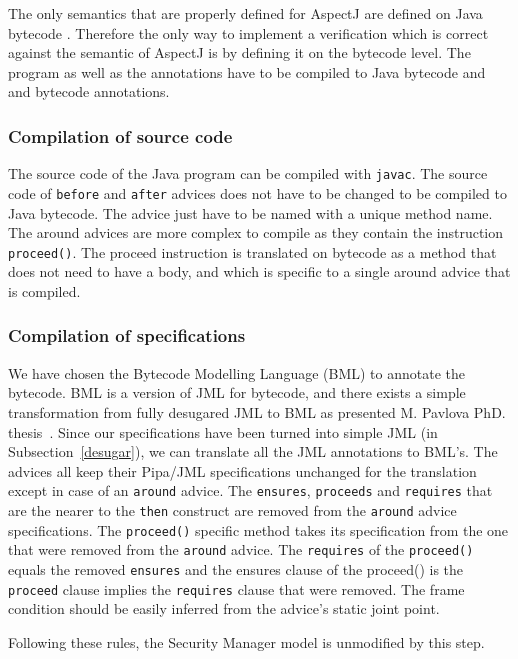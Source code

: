 The only semantics that are properly defined for AspectJ are defined
on Java bytecode \cite{weaving06,weaving04}. Therefore the only way to
implement a verification which is correct against the semantic of
AspectJ is by defining it on the bytecode level.  The program as well
as the annotations have to be compiled to Java bytecode and
and bytecode annotations. 

\vspace{-0.4cm}
\subsubsection{Compilation of source code}
The source code of the Java program can be compiled with {\tt javac}.
The source code of {\tt before} and {\tt after}
advices does not have to be changed to be compiled to Java bytecode.
The advice just have to be named with a unique method name.
The around advices are more complex to compile as they contain the instruction
{\tt proceed()}. The proceed instruction is translated on bytecode as
a method that does not need to have a body, and which is specific 
to a single around advice that is compiled.

\vspace{-0.4cm}
\subsubsection{Compilation of specifications} 
We have chosen the Bytecode Modelling Language (BML) to annotate the
bytecode. BML is a version of JML for bytecode, and there exists a
simple transformation from fully desugared JML to BML as presented
M. Pavlova PhD. thesis~\cite{PavlovaPhd}. Since our specifications
have been turned into simple JML (in Subsection~\ref{desugar}), we can
translate all the JML annotations to BML's. The advices all keep their
Pipa/JML specifications unchanged for the translation
except in case of an {\tt around} advice.
The {\tt ensures}, {\tt proceeds} and {\tt requires} that are the
nearer to the {\tt then} construct are removed from the {\tt around}
advice specifications. The {\tt proceed()} specific method takes its
specification from the one that were removed from the {\tt around} advice.
The {\tt requires} of the {\tt proceed()} equals the removed {\tt ensures}
and the ensures clause of the proceed() is the {\tt proceed} clause 
implies the {\tt requires} clause that were removed.
The frame condition should be easily inferred from the advice's 
static joint point.

Following these rules, the Security Manager model is unmodified by this step.

